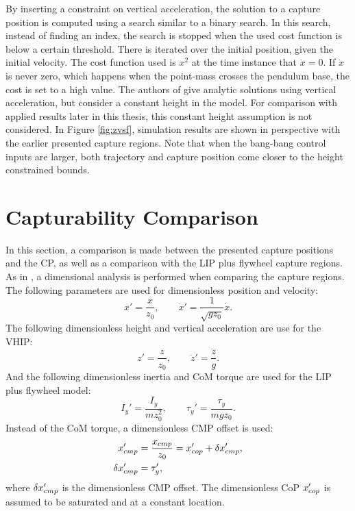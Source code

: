 By inserting a constraint on vertical acceleration, the solution to a capture position is computed using a search similar to a binary search. In this search, instead of finding an index, the search is stopped when the used cost function is below a certain threshold. There is iterated over the initial position, given the initial velocity. The cost function used is $x^2$ at the time instance that $\dot{x}=0$.  If $\dot{x}$ is never zero, which happens when the point-mass crosses the pendulum base, the cost is set to a high value. The authors of \cite{gao2017increase} give analytic solutions using vertical acceleration, but consider a constant height in the model. For comparison with applied results later in this thesis, this constant height assumption is not considered. In Figure \ref{fig:zvsf}, simulation results are shown in perspective with the earlier presented capture regions. Note that when the bang-bang control inputs are larger, both trajectory and capture position come closer to the height constrained bounds.

\section{Capturability Comparison}
In this section, a comparison is made between the presented capture positions and the \ac{CP}, as well as a comparison with the \ac{LIP} plus flywheel capture regions. As in \cite{pratt2006capture, stephens2007humanoid, koolen2012capturability}, a dimensional analysis \cite{mcmahon1983size} is performed when comparing the capture regions. The following parameters are used for dimensionless position and velocity:
\begin{equation}
	x' = \frac{x}{z_0}, \qquad \dot{x}' = \frac{1}{\sqrt{gz_0}}\dot{x}.
\end{equation}
The following dimensionless height and vertical acceleration are use for the \ac{VHIP}:
\begin{equation}
 z' = \frac{z}{z_0}, \qquad \ddot{z}'=\frac{\ddot{z}}{g}.
\end{equation}
And the following dimensionless inertia and \ac{CoM} torque are used for the \ac{LIP} plus flywheel model:
\begin{equation}
I_y'=\frac{I_y}{mz_0^2}, \qquad \tau_y' = \frac{\tau_y}{mgz_0}.
\end{equation}
Instead of the \ac{CoM} torque, a dimensionless \ac{CMP} offset is used:
\begin{align}
	x_{cmp}' &=\frac{x_{cmp}}{z_0}=x_{cop}' + \delta x_{cmp}',\\
	\delta x_{cmp}' &=\tau_y',
\end{align}
where $\delta x_{cmp}'$ is the dimensionless \ac{CMP} offset. The dimensionless \ac{CoP} $x_{cop}'$ is assumed to be saturated and at a constant location.


